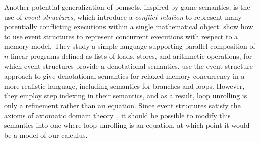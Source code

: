 \documentclass[acmsmall,screen,review]{acmart}
\newcounter{todos}
\newcommand{\TODO}[1]{{
  \stepcounter{todos}
  \begin{center}\large{\textcolor{red}{\textbf{TODO \arabic{todos}:} #1}}\end{center}
}}
\begin{document}
Another potential generalization of pomsets, inspired by game semantics, is the use of \emph{event
structures}, which introduce a \emph{conflict relation} to represent many potentially conflicting
executions within a single mathematical object. \citet{castellan-16} show how to use event
structures to represent concurrent executions with respect to a memory model. They study a simple
language supporting parallel composition of $n$ linear programs defined as lists of loads, stores,
and arithmetic operations, for which event structures provide a denotational semantics.
\citet{paviotti-modular-relaxed-dep-20} use the event structure approach to give denotational
semantics for relaxed memory concurrency in a more realistic language, including semantics for
branches and loops. However, they employ step indexing in their semantics, and as a result, loop
unrolling is only a refinement rather than an equation. Since event structures satisfy the axioms of
axiomatic domain theory~\cite{fiore-phd-94}, it should be possible to modify this semantics into one
where loop unrolling is an equation, at which point it would be a model of our calculus.

\end{document}
